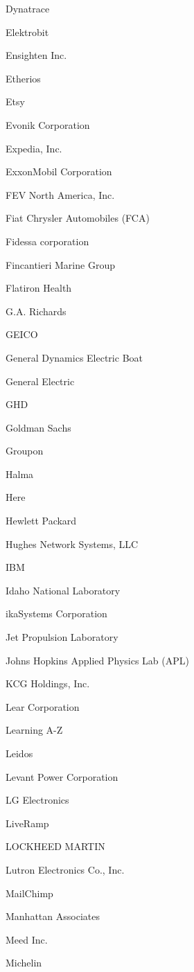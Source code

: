 \documentclass[twoside]{article}
\begin{document}
\begin{center}
\begin{multicols}{5}
\begin{FlushLeft}
\begin{compactitem}
\item Dynatrace
\item Elektrobit
\item Ensighten Inc.
\item Etherios
\item Etsy
\item Evonik Corporation
\item Expedia, Inc.
\item ExxonMobil Corporation
\item FEV North America, Inc.
\item Fiat Chrysler Automobiles (FCA)
\item Fidessa corporation
\item Fincantieri Marine Group
\item Flatiron Health
\item G.A. Richards
\item GEICO
\item General Dynamics Electric Boat
\item General Electric
\item GHD
\item Goldman Sachs
\item Groupon
\item Halma
\item Here
\item Hewlett Packard
\item Hughes Network Systems, LLC
\item IBM
\item Idaho National Laboratory
\item ikaSystems Corporation
\item Jet Propulsion Laboratory
\item Johns Hopkins Applied Physics Lab (APL)
\item KCG Holdings, Inc.
\item Lear Corporation
\item Learning A-Z
\item Leidos
\item Levant Power Corporation
\item LG Electronics
\item LiveRamp
\item LOCKHEED MARTIN
\item Lutron Electronics Co., Inc.
\item MailChimp
\item Manhattan Associates
\item Meed Inc.
\item Michelin

\end{compactitem}
\end{FlushLeft}
\end{multicols}
\end{center}
\end{document}
